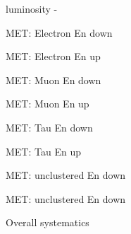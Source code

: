 \documentclass{article}
\begin{document}
luminosity -

MET: Electron En down

MET: Electron En up

MET: Muon En down

MET: Muon En up

MET: Tau En down

MET: Tau En up

MET: unclustered En down

MET: unclustered En down

Overall systematics
\end{document}
